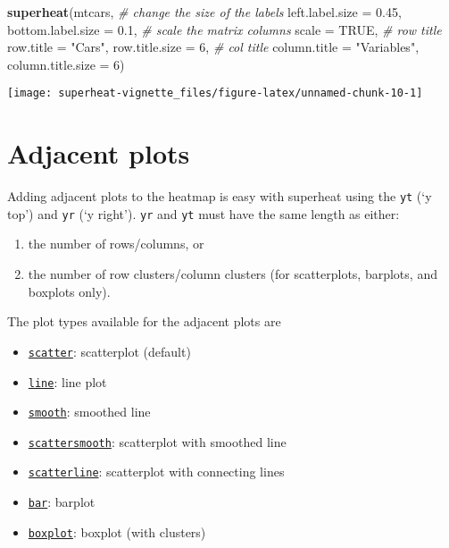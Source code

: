 \documentclass[]{book}
\newenvironment{Shaded}{\begin{snugshade}}{\end{snugshade}}
\newcommand{\KeywordTok}[1]{\textcolor[rgb]{0.13,0.29,0.53}{\textbf{{#1}}}}
\newcommand{\DataTypeTok}[1]{\textcolor[rgb]{0.13,0.29,0.53}{{#1}}}
\newcommand{\DecValTok}[1]{\textcolor[rgb]{0.00,0.00,0.81}{{#1}}}
\newcommand{\FloatTok}[1]{\textcolor[rgb]{0.00,0.00,0.81}{{#1}}}
\newcommand{\StringTok}[1]{\textcolor[rgb]{0.31,0.60,0.02}{{#1}}}
\newcommand{\CommentTok}[1]{\textcolor[rgb]{0.56,0.35,0.01}{\textit{{#1}}}}
\newcommand{\OtherTok}[1]{\textcolor[rgb]{0.56,0.35,0.01}{{#1}}}
\newcommand{\NormalTok}[1]{{#1}}
\theoremstyle{definition}
\theoremstyle{definition}
\theoremstyle{remark}
\begin{document}
\begin{Shaded}
\begin{Highlighting}[]
\KeywordTok{superheat}\NormalTok{(mtcars,}
          \CommentTok{# change the size of the labels}
          \DataTypeTok{left.label.size =} \FloatTok{0.45}\NormalTok{,}
          \DataTypeTok{bottom.label.size =} \FloatTok{0.1}\NormalTok{,}
          \CommentTok{# scale the matrix columns}
          \DataTypeTok{scale =} \OtherTok{TRUE}\NormalTok{,}
          \CommentTok{# row title}
          \DataTypeTok{row.title =} \StringTok{"Cars"}\NormalTok{,}
          \DataTypeTok{row.title.size =} \DecValTok{6}\NormalTok{,}
          \CommentTok{# col title}
          \DataTypeTok{column.title =} \StringTok{"Variables"}\NormalTok{,}
          \DataTypeTok{column.title.size =} \DecValTok{6}\NormalTok{)}
\end{Highlighting}
\end{Shaded}

\begin{center}\texttt{[image: superheat-vignette\_files/figure-latex/unnamed-chunk-10-1]} \end{center}

\chapter{Adjacent plots}\label{adjacent-plots}

Adding adjacent plots to the heatmap is easy with superheat using the
\texttt{yt} (`y top') and \texttt{yr} (`y right'). \texttt{yr} and
\texttt{yt} must have the same length as either:

\begin{enumerate}
\def\labelenumi{\arabic{enumi}.}
\item
  the number of rows/columns, or
\item
  the number of row clusters/column clusters (for scatterplots,
  barplots, and boxplots only).
\end{enumerate}

The plot types available for the adjacent plots are

\begin{itemize}
\item
  \protect\hyperlink{scatterplot}{\texttt{scatter}}: scatterplot
  (default)
\item
  \protect\hyperlink{line}{\texttt{line}}: line plot
\item
  \protect\hyperlink{smooth}{\texttt{smooth}}: smoothed line
\item
  \protect\hyperlink{scattersmooth}{\texttt{scattersmooth}}: scatterplot
  with smoothed line
\item
  \protect\hyperlink{scatterline}{\texttt{scatterline}}: scatterplot
  with connecting lines
\item
  \protect\hyperlink{bar}{\texttt{bar}}: barplot
\item
  \protect\hyperlink{boxplot}{\texttt{boxplot}}: boxplot (with clusters)
\end{itemize}
\end{document}
